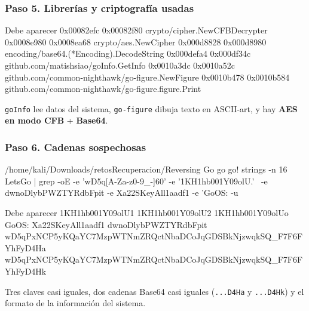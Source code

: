 \documentclass[11pt,a4paper]{article}
\begin{document}
\subsubsection*{Paso 5. Librerías y criptografía usadas}
\begin{salida}{Debe aparecer}
0x00082efc 0x00082f80 crypto/cipher.NewCFBDecrypter
0x0008e980 0x0008ea68 crypto/aes.NewCipher
0x000d8828 0x000d8980 encoding/base64.(*Encoding).DecodeString
0x000defa4 0x000df34c github.com/matishsiao/goInfo.GetInfo
0x0010a3dc 0x0010a52c github.com/common-nighthawk/go-figure.NewFigure
0x0010b478 0x0010b584 github.com/common-nighthawk/go-figure.figure.Print
\end{salida}
\begin{nota}\texttt{goInfo} lee datos del sistema, \texttt{go-figure} dibuja texto en ASCII-art, y hay \textbf{AES en modo CFB} + \textbf{Base64}.\end{nota}

\subsubsection*{Paso 6. Cadenas sospechosas}
\begin{comando}{/home/kali/Downloads/retosRecuperacion/Reversing Go go go!}
strings -n 16 LetsGo | grep -oE -e 'wD5q[A-Za-z0-9_-]{60}' -e '1KH1hb001Y09olU.' \
  -e dwnoDlybPWZTYRdbFpit -e Xa22SKeyAll1aadf1 -e 'GoOS:%
  -u
\end{comando}
\begin{salida}{Debe aparecer}
1KH1hb001Y09olU1
1KH1hb001Y09olU2
1KH1hb001Y09olUo
GoOS:%
Xa22SKeyAll1aadf1
dwnoDlybPWZTYRdbFpit
wD5qPxNCP5yKQaYC7MzpWTNmZRQctNbaDCoJqGDSBkNjzwqkSQ_F7F6FYhFyD4Ha
wD5qPxNCP5yKQaYC7MzpWTNmZRQctNbaDCoJqGDSBkNjzwqkSQ_F7F6FYhFyD4Hk
\end{salida}
\begin{nota}Tres claves casi iguales, dos cadenas Base64 casi iguales (\texttt{...D4Ha} y \texttt{...D4Hk}) y el formato de la información del sistema.\end{nota}
\end{document}
